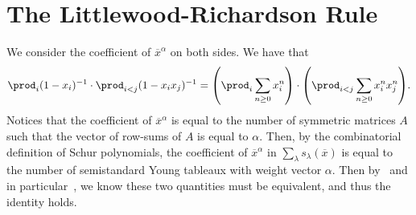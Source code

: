 \documentclass[letterpaper, 11pt, oneside]{book}
\begin{document}
\clearpage

\section{The Littlewood-Richardson Rule}

\begin{sol}\label{ex:Manivel_1.5.4}
  We consider the coefficient of $\overline{x}^{\alpha}$ on both sides.
  We have that
  \[
    \prod_{i} (1 - x_{i})^{-1} \cdot \prod_{i < j} (1 - x_{i}x_{j})^{-1} = \pqty{\prod_{i} \sum_{n \geq 0} x_{i}^{n}} \cdot \pqty{\prod_{i < j} \sum_{n \geq 0} x_{i}^{n}x_{j}^{n}}.
  \]
  Notices that the coefficient of $\overline{x}^{\alpha}$ is equal to the number of symmetric matrices $A$ such that the vector of row-sums of $A$ is equal to $\alpha$.
  Then, by the combinatorial definition of Schur polynomials, the coefficient of $\overline{x}^{\alpha}$ in $\sum_{\lambda} s_{\lambda}(\overline{x})$ is equal to the number of semistandard Young tableaux with weight vector $\alpha$.
  Then by~\cite[Knuth Correspondence 1.3.4]{book:ManivelSFSPDL} and in particular~\cite[Corollary 1.5.3]{book:ManivelSFSPDL}, we know these two quantities must be equivalent, and thus the identity holds.
\end{sol}

\printbibliography
\end{document}
